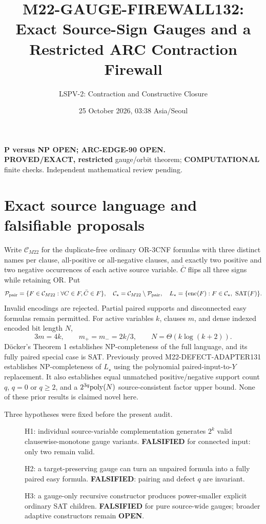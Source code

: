 \documentclass[11pt]{article}
\title{M22-GAUGE-FIREWALL132: Exact Source-Sign Gauges and a Restricted ARC Contraction Firewall}
\author{LSPV-2: Contraction and Constructive Closure}
\date{25 October 2026, 03:38 Asia/Seoul}
\begin{document}
\maketitle
\begin{center}
\textbf{P versus NP OPEN; ARC-EDGE-90 OPEN.}\\
\textbf{PROVED/EXACT, restricted} gauge/orbit theorem; \textbf{COMPUTATIONAL} finite checks. Independent mathematical review pending.
\end{center}

\section{Exact source language and falsifiable proposals}
Write $\mathcal C_{M22}$ for the duplicate-free ordinary OR-3CNF
formulas with three distinct names per clause, all-positive or all-negative
clauses, and exactly two positive and two negative occurrences
of each active source variable. $\bar C$ flips all three
signs while retaining OR. Put
\[
\mathcal P_{\rm pair}=\{F\in\mathcal C_{M22}:\forall C\in F,\bar C\in F\},
\quad
\mathcal C_\star=\mathcal C_{M22}\setminus\mathcal P_{\rm pair},\quad
L_\star=\{\operatorname{enc}(F): F\in\mathcal C_\star,\ {\rm SAT}(F)\}.
\]
Invalid encodings are rejected. Partial paired supports and
disconnected easy formulas remain permitted. For active variables $k$,
clauses $m$, and dense indexed encoded bit length $N$,
\[
3m=4k,\qquad m_+=m_-=2k/3,\qquad N=\Theta(k\log(k+2)).
\]
D\"ocker's Theorem 1 establishes NP-completeness of the full language,
and its fully paired special case is SAT. Previously proved
M22-DEFECT-ADAPTER131 establishes NP-completeness of $L_\star$
using the polynomial paired-input-to-$Y$ replacement.
It also establishes equal unmatched positive/negative
support count $q$, $q=0$ or $q\ge2$, and a
$2^{3q}{\rm poly}(N)$ source-consistent factor upper bound.
None of these prior results is claimed novel here.

Three hypotheses were fixed before the present audit.
\begin{description}
\item[] H1: individual source-variable complementation generates
$2^k$ valid clausewise-monotone gauge variants. \textbf{FALSIFIED}
for connected input: only two remain valid.
\item[] H2: a target-preserving gauge can turn an unpaired formula
into a fully paired easy formula. \textbf{FALSIFIED}:
pairing and defect $q$ are invariant.
\item[] H3: a gauge-only recursive constructor produces
power-smaller explicit ordinary SAT children. \textbf{FALSIFIED}
for pure source-wide gauges; broader adaptive constructors
remain \textbf{OPEN}.
\end{description}
\end{document}
